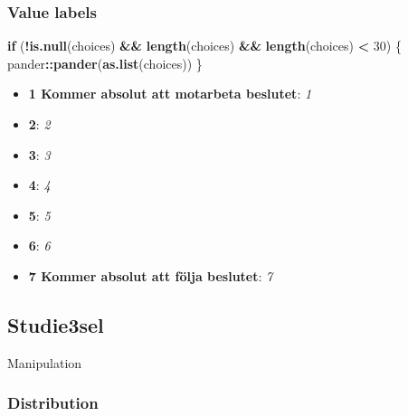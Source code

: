 \documentclass[]{book}
\newenvironment{Shaded}{\begin{snugshade}}{\end{snugshade}}
\newcommand{\KeywordTok}[1]{\textcolor[rgb]{0.13,0.29,0.53}{\textbf{#1}}}
\newcommand{\DecValTok}[1]{\textcolor[rgb]{0.00,0.00,0.81}{#1}}
\newcommand{\StringTok}[1]{\textcolor[rgb]{0.31,0.60,0.02}{#1}}
\newcommand{\ControlFlowTok}[1]{\textcolor[rgb]{0.13,0.29,0.53}{\textbf{#1}}}
\newcommand{\OperatorTok}[1]{\textcolor[rgb]{0.81,0.36,0.00}{\textbf{#1}}}
\newcommand{\NormalTok}[1]{#1}
\providecommand{\tightlist}{%
  \setlength{\itemsep}{0pt}\setlength{\parskip}{0pt}}
\begin{document}
\subsubsection{Value labels}\label{S3_8_1_2_labels}

\begin{Shaded}
\begin{Highlighting}[]
\ControlFlowTok{if}\NormalTok{ (}\OperatorTok{!}\KeywordTok{is.null}\NormalTok{(choices) }\OperatorTok{&&}\StringTok{ }\KeywordTok{length}\NormalTok{(choices) }\OperatorTok{&&}\StringTok{ }\KeywordTok{length}\NormalTok{(choices) }\OperatorTok{<}\StringTok{ }\DecValTok{30}\NormalTok{) \{}
\NormalTok{    pander}\OperatorTok{::}\KeywordTok{pander}\NormalTok{(}\KeywordTok{as.list}\NormalTok{(choices))}
\NormalTok{\}}
\end{Highlighting}
\end{Shaded}

\begin{itemize}
\tightlist
\item
  \textbf{1 Kommer absolut att motarbeta beslutet}: \emph{1}
\item
  \textbf{2}: \emph{2}
\item
  \textbf{3}: \emph{3}
\item
  \textbf{4}: \emph{4}
\item
  \textbf{5}: \emph{5}
\item
  \textbf{6}: \emph{6}
\item
  \textbf{7 Kommer absolut att följa beslutet}: \emph{7}
\end{itemize}

\subsection{Studie3sel}\label{Studie3sel}

Manipulation

\subsubsection{Distribution}\label{Studie3sel_distribution}
\end{document}
